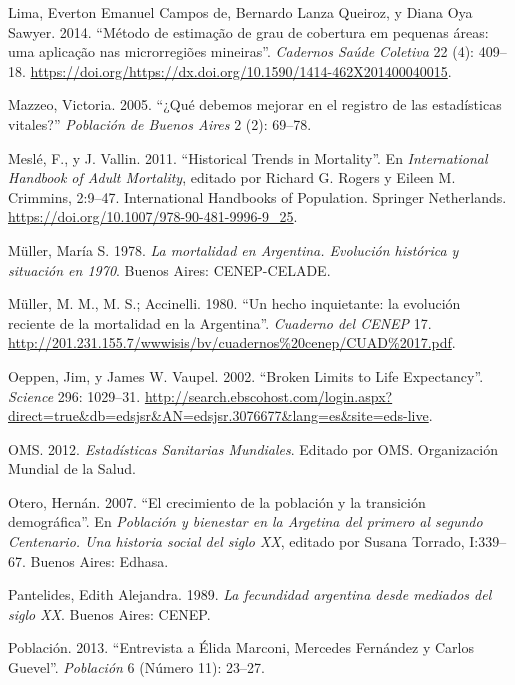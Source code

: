 \documentclass[12pt,spanish,]{article}
\begin{document}
\leavevmode\hypertarget{ref-LimaQueirozSawyer2014}{}%
Lima, Everton Emanuel Campos de, Bernardo Lanza Queiroz, y Diana Oya
Sawyer. 2014. ``Método de estimação de grau de cobertura em pequenas
áreas: uma aplicação nas microrregiões mineiras''. \emph{Cadernos Saúde
Coletiva} 22 (4): 409--18.
\url{https://doi.org/https://dx.doi.org/10.1590/1414-462X201400040015}.

\leavevmode\hypertarget{ref-Mazzeo2005}{}%
Mazzeo, Victoria. 2005. ``¿Qué debemos mejorar en el registro de las
estadísticas vitales?'' \emph{Población de Buenos Aires} 2 (2): 69--78.

\leavevmode\hypertarget{ref-MesleVallin2011}{}%
Meslé, F., y J. Vallin. 2011. ``Historical Trends in Mortality''. En
\emph{International Handbook of Adult Mortality}, editado por Richard G.
Rogers y Eileen M. Crimmins, 2:9--47. International Handbooks of
Population. Springer Netherlands.
\url{https://doi.org/10.1007/978-90-481-9996-9_25}.

\leavevmode\hypertarget{ref-Mueller1978}{}%
Müller, María S. 1978. \emph{La mortalidad en Argentina. Evolución
histórica y situación en 1970}. Buenos Aires: CENEP-CELADE.

\leavevmode\hypertarget{ref-MuellerAccinelli1980}{}%
Müller, M. M., M. S.; Accinelli. 1980. ``Un hecho inquietante: la
evolución reciente de la mortalidad en la Argentina''. \emph{Cuaderno
del CENEP} 17.
\url{http://201.231.155.7/wwwisis/bv/cuadernos\%20cenep/CUAD\%2017.pdf}.

\leavevmode\hypertarget{ref-OeppenVaupel2002}{}%
Oeppen, Jim, y James W. Vaupel. 2002. ``Broken Limits to Life
Expectancy''. \emph{Science} 296: 1029--31.
\url{http://search.ebscohost.com/login.aspx?direct=true\&db=edsjsr\&AN=edsjsr.3076677\&lang=es\&site=eds-live}.

\leavevmode\hypertarget{ref-OMS2012}{}%
OMS. 2012. \emph{Estadísticas Sanitarias Mundiales}. Editado por OMS.
Organización Mundial de la Salud.

\leavevmode\hypertarget{ref-Otero2007}{}%
Otero, Hernán. 2007. ``El crecimiento de la población y la transición
demográfica''. En \emph{Población y bienestar en la Argetina del primero
al segundo Centenario. Una historia social del siglo XX}, editado por
Susana Torrado, I:339--67. Buenos Aires: Edhasa.

\leavevmode\hypertarget{ref-Pantelides1989}{}%
Pantelides, Edith Alejandra. 1989. \emph{La fecundidad argentina desde
mediados del siglo XX}. Buenos Aires: CENEP.

\leavevmode\hypertarget{ref-Poblacion2013}{}%
Población. 2013. ``Entrevista a Élida Marconi, Mercedes Fernández y
Carlos Guevel''. \emph{Población} 6 (Número 11): 23--27.
\end{document}
